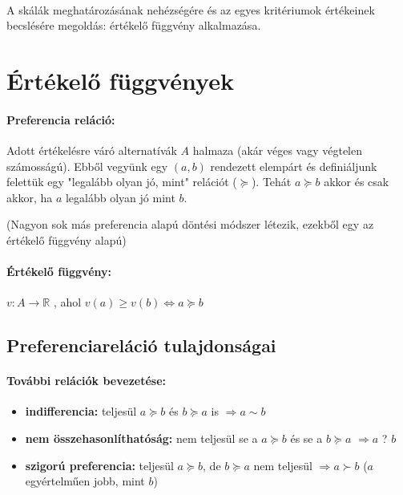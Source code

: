\documentclass[a4paper,12pt]{article}
\begin{document}
\

A skálák meghatározásának nehézségére és az egyes kritériumok értékeinek becslésére megoldás: értékelő függvény alkalmazása.

\section{Értékelő függvények}


\paragraph{Preferencia reláció: } Adott értékelésre váró alternatívák $A$ halmaza (akár véges vagy végtelen számosságú). Ebből vegyünk egy $(a,b)$ rendezett elempárt és definiáljunk felettük egy "legalább olyan jó, mint" relációt ($\succeq$). Tehát $a \succeq b$ akkor és csak akkor, ha $a$ legalább olyan jó mint $b$. 

\small{(Nagyon sok más preferencia alapú döntési módszer létezik, ezekből egy az értékelő függvény alapú)}

\paragraph{Értékelő függvény: }  $v: A \rightarrow \mathbb{R}$ , ahol $v(a) \geq v(b) \Leftrightarrow a \succeq b$

\subsection{Preferenciareláció tulajdonságai}

\paragraph{További relációk bevezetése:}

\begin{itemize}
\item \textbf{indifferencia:}  teljesül $a \succeq b $ és $b \succeq a$ is $\Rightarrow a \sim b$
\item \textbf{nem összehasonlíthatóság:}  nem teljesül se a $a \succeq b $ és se a $b \succeq a $  $\Rightarrow a$ ? $b$
\item \textbf{szigorú preferencia:} teljesül $a \succeq b $, de $b \succeq a$ nem teljesül $\Rightarrow a \succ b$ ($a$ egyértelműen jobb, mint $b$)
\end{itemize}
\end{document}
